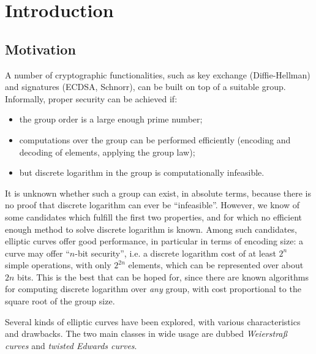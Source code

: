 \documentclass{llncs}
\begin{document}

\section{Introduction}\label{sec:intro}

\subsection{Motivation}

A number of cryptographic functionalities, such as key exchange
(Diffie-Hellman\cite{DifHel1976}) and signatures
(ECDSA\cite{X962,Fips186}, Schnorr\cite{Sch89}), can be built on top of
a suitable group. Informally, proper security can be achieved if:
\begin{itemize}

    \item the group order is a large enough prime number;

    \item computations over the group can be performed efficiently
    (encoding and decoding of elements, applying the group law);

    \item but discrete logarithm in the group is computationally
    infeasible.

\end{itemize}
It is unknown whether such a group can exist, in absolute terms, because
there is no proof that discrete logarithm can ever be ``infeasible''.
However, we know of some candidates which fulfill the first two
properties, and for which no efficient enough method to solve discrete
logarithm is known. Among such candidates, elliptic curves offer good
performance, in particular in terms of encoding size: a curve may offer
``$n$-bit security'', i.e. a discrete logarithm cost of at least $2^n$
simple operations, with only $2^{2n}$ elements, which can be represented
over about $2n$ bits. This is the best that can be hoped for, since
there are known algorithms for computing discrete logarithm over
\emph{any} group, with cost proportional to the square root of the group
size.

Several kinds of elliptic curves have been explored, with various
characteristics and drawbacks. The two main classes in wide usage are
dubbed \emph{Weierstraß curves} and \emph{twisted Edwards curves}.
\end{document}
